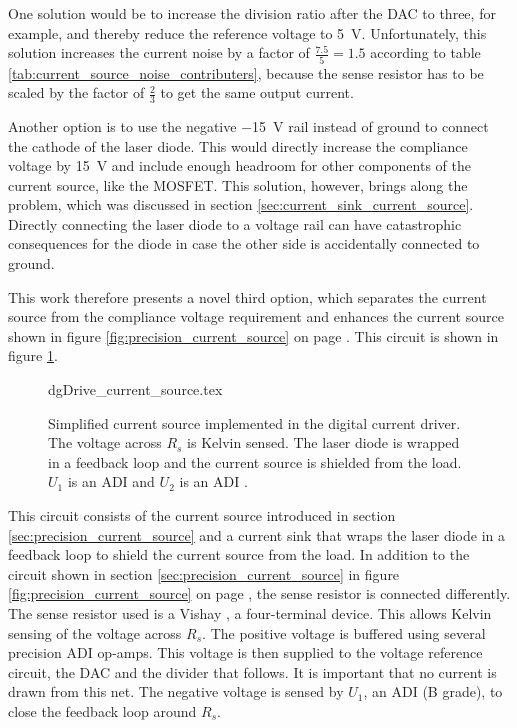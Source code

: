 One solution would be to increase the division ratio after the DAC to three, for example, and thereby reduce the reference voltage to \qty{5}{\V}. Unfortunately, this solution increases the current noise by a factor of $\frac{7.5}{5} = 1.5$ according to table \ref{tab:current_source_noise_contributers}, because the sense resistor has to be scaled by the factor of $\frac{2}{3}$ to get the same output current.

Another option is to use the negative \qty{-15}{\V} rail instead of ground to connect the cathode of the laser diode. This would directly increase the compliance voltage by \qty{15}{\V} and include enough headroom for other components of the current source, like the MOSFET. This solution, however, brings along the problem, which was discussed in section \ref{sec:current_sink_current_source}. Directly connecting the laser diode to a voltage rail can have catastrophic consequences for the diode in case the other side is accidentally connected to ground.

This work therefore presents a novel third option, which separates the current source from the compliance voltage requirement and enhances the current source shown in figure \ref{fig:precision_current_source} on page \pageref{fig:precision_current_source}. This circuit is shown in figure \ref{fig:dgDrive_current_source}.
\begin{figure}[ht]
    \centering
        {dgDrive_current_source.tex}
    \caption{Simplified current source implemented in the digital current driver. The voltage across $R_s$ is Kelvin sensed. The laser diode is wrapped in a feedback loop and the current source is shielded from the load. $U_1$ is an ADI  and $U_2$ is an ADI .}
    \label{fig:dgDrive_current_source}
\end{figure}

This circuit consists of the current source introduced in section \ref{sec:precision_current_source} and a current sink that wraps the laser diode in a feedback loop to shield the current source from the load. In addition to the circuit shown in section \ref{sec:precision_current_source} in figure \ref{fig:precision_current_source} on page \pageref{fig:precision_current_source}, the sense resistor is connected differently. The sense resistor used is a Vishay  \cite{datasheet_VPR}, a four-terminal device. This allows Kelvin sensing of the voltage across $R_s$. The positive voltage is buffered using several precision ADI  \cite{datasheet_ADA4077} op-amps. This voltage is then supplied to the voltage reference circuit, the DAC and the divider that follows. It is important that no current is drawn from this net. The negative voltage is sensed by $U_1$, an ADI  (B grade), to close the feedback loop around $R_s$.

